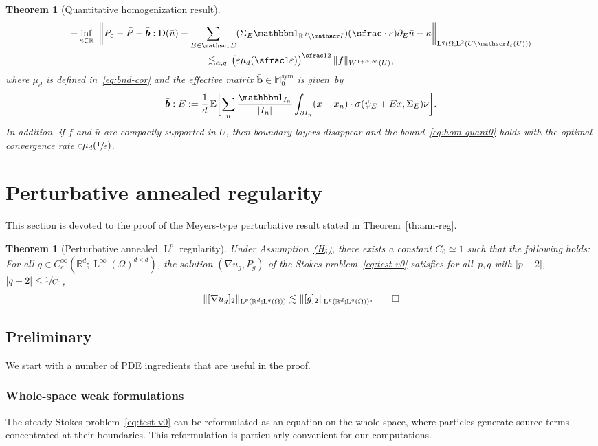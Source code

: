 \documentclass[JEP,XML,SOM,Unicode,published]{cedram}
\let\mathcal\mathscr
\newcommand{\Hd}{\hyperref[Hd]{\textup{(H$_\delta$)}}\xspace}
\let\mathds\mathbbm
\theoremstyle{plain}
\newtheorem{theor1}{Theorem}
\newtheorem{theor}{Theorem}[section]
\theoremstyle{definition}
\newcommand{\e}{\varepsilon}
\newcommand{\Ec}{\mathcal E}
\newcommand{\R}{\mathbb R}
\newcommand{\Ic}{\mathcal I}
\newcommand{\Md}{\mathbb M}
\newcommand{\D}{\operatorname{D}}
\newcommand{\bb}{\bar{\boldsymbol b}}
\newcommand{\Ld}{\operatorname{L}}
\newcommand{\Sym}{{\operatorname{sym}}}
\newcommand{\expecM}[1]{\mathbb{E}\biggl[ #1 \biggr]}
\begin{document}
\begin{theor1}[Quantitative homogenization result]
\begin{multline}
+\inf_{\kappa\in\R}~\bigg\|P_\e-\bar P-\bb:\D(\bar u)
-\sum_{E\in\Ec}(\Sigma_E\mathds1_{\R^d\setminus\Ic})(\sfrac\cdot\e)\partial_E\bar u-\kappa\bigg\|_{\Ld^q(\Omega;\Ld^2(U\setminus\Ic_\e(U)))}\\
\lesssim_{\alpha,q}\,
\big(\e\mu_d(\sfrac1\e)\big)^{\sfrac12}\,\|f\|_{W^{1+\alpha,\infty}(U)},
\end{multline}
where $\mu_d$ is defined in~\eqref{eq:bnd-cor}
and the effective matrix $\bb\in\Md_0^\Sym$ is given~by
\begin{equation}\label{eq:def-b}
\bb:E:= \frac1d\,\expecM{\sum_n\frac{\mathds1_{I_n}}{|I_n|}\int_{\partial I_n}(x-x_n)\cdot\sigma(\psi_E+Ex,\Sigma_E)\nu}.
\end{equation}
In addition, if $f$ and $\bar u$ are compactly supported in $U$, then boundary layers disappear and the bound~\eqref{eq:hom-quant0} holds with the optimal convergence rate $\e\mu_d(\sfrac1\e)$.
\end{theor1}

\section{Perturbative annealed regularity}\label{sec:Meyers}

This section is devoted to the proof of the Meyers-type perturbative result stated in Theorem~\ref{th:ann-reg}.

\begin{samepage}
\begin{theor}[Perturbative annealed $\Ld^p$ regularity]\label{th:meyers-ann}
Under Assumption~\Hd, there exists a constant $C_0\simeq1$ such that the following holds:
For all $g\in C^\infty_c(\R^d;\Ld^\infty(\Omega)^{d\times d})$, the solution $(\nabla u_g,P_g)$ of the Stokes problem~\eqref{eq:test-v0} satisfies for all~$p,q$ with $|p-2|$, $|q-2|\le\sfrac1{C_0}$,
\[\|[\nabla u_g]_2\|_{\Ld^p(\R^d;\Ld^q(\Omega))}\lesssim \|[g]_2\|_{\Ld^p(\R^d;\Ld^q(\Omega))}.\qedhere\]
\end{theor}
\end{samepage}

\subsection{Preliminary}
We start with a number of PDE ingredients that are useful in the proof.

\vspace{-0.3cm}
\subsubsection{Whole-space weak formulations}
The steady Stokes problem~\eqref{eq:test-v0} can be reformulated as an equation on the whole space, where particles generate source terms concentrated at their boundaries. This reformulation is particularly convenient for our computations.
\end{document}
